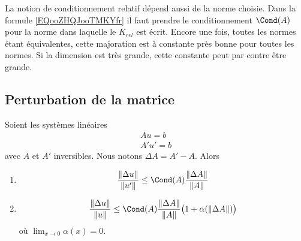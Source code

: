 \begin{remark}      \label{REMooAIKIooJEBEqi}
	La notion de conditionnement relatif dépend aussi de la norme choisie. Dans la formule \eqref{EQooZHQJooTMKYfr} il faut prendre le conditionnement \( \Cond(A)\) pour la norme dans laquelle le \( K_{rel}\) est écrit. Encore une fois, toutes les normes étant équivalentes,  cette majoration est à constante près bonne pour toutes les normes. Si la dimension est très grande, cette constante peut par contre être grande.
\end{remark}

\subsection{Perturbation de la matrice}

\begin{proposition}
	Soient les systèmes linéaires
	\begin{subequations}
		\begin{align}
			Au=b \\
			A'u'=b
		\end{align}
	\end{subequations}
	avec \( A\) et \( A'\) inversibles. Nous notons \( \Delta A=A'-A\). Alors
	\begin{enumerate}
		\item       \label{ITEMooJMTKooSEBavB}
		      \begin{equation}
			      \frac{ \| \Delta u \| }{ \| u' \| }\leq \Cond(A)\frac{ \| \Delta A \| }{ \| A \| }
		      \end{equation}
		\item
		      \begin{equation}
			      \frac{ \| \Delta u \| }{ \| u \| }\leq \Cond(A)\frac{ \| \Delta A \| }{ \| A \| }\big( 1+\alpha(\| \Delta A \|) \big)
		      \end{equation}
		      où \( \lim_{x\to 0} \alpha(x)=0\).
	\end{enumerate}
\end{proposition}

